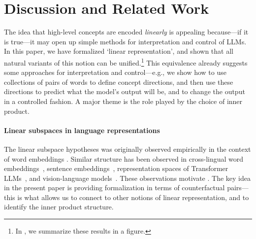 \documentclass{article}
\theoremstyle{plain}
\theoremstyle{definition}
\theoremstyle{remark}
\begin{document}
\section{Discussion and Related Work}\label{sec:relatedwork}
The idea that high-level concepts are encoded \emph{linearly} is appealing because---if it is true---it may open up simple methods for interpretation and control of LLMs.
In this paper, we have formalized `linear representation', and shown that all natural variants of this notion can be unified.\footnote{In , we summarize these results in a figure.} 
This equivalence already suggests some approaches for interpretation and control---e.g., we show how to use collections of pairs of words to define concept directions,
and then use these directions to predict what the model's output will be,
and to change the output in a controlled fashion.
A major theme is the role played by the choice of inner product.

\paragraph{Linear subspaces in language representations}
The linear subspace hypotheses was originally observed empirically in the context of word embeddings \citep[e.g.,][]{mikolov2013distributed,mikolov2013linguistic,levy2014linguistic,goldberg2014word2vec,vylomova2016take,gladkova2016analogy,chiang2020understanding, fournier2020analogies}. Similar structure has been observed in cross-lingual word embeddings~\citep{mikolov2013exploiting,lample2018word,ruder2019survey,peng2022understanding}, sentence embeddings~\citep{bowman2016generating,zhu2020sentence,li2020sentence,ushio2021bert}, representation spaces of Transformer LLMs~\citep{meng2022locating,merullo2023language,hernandez2023linearity}, and vision-language models~\citep{wang2023concept,trager2023linear,perera2023prompt}.
These observations motivate . 
The key idea in the present paper is providing formalization in terms of counterfactual pairs---this is what allows us to connect to other notions of linear representation, and to identify the inner product structure.
\end{document}
